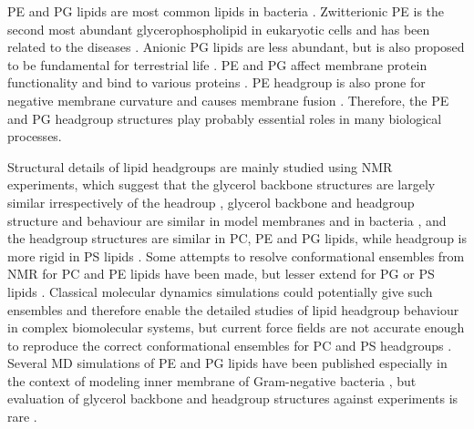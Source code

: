 \documentclass[aps,prl,superscriptaddress,twocolumn]{revtex4}
\begin{document}
PE and PG lipids are most common lipids in bacteria \cite{sohlenkamp16}.
Zwitterionic PE is the second most abundant glycerophospholipid in eukaryotic cells
and has been related to the diseases \cite{vance15,calzada16,patel17}.
Anionic PG lipids are less abundant, but is also proposed to be fundamental for terrestrial life \cite{furse17}.
PE and PG affect membrane protein functionality \cite{hariharan18} and bind to various proteins \cite{yeagle14}.
PE headgroup is also prone for negative membrane curvature and causes membrane fusion \cite{Chernomordik08,calzada16}.
Therefore, the PE and PG headgroup structures play probably essential roles in 
many biological processes.

Structural details of lipid headgroups are mainly studied using NMR experiments, which
suggest that the glycerol backbone structures are largely similar irrespectively of the headroup \cite{gally81}, 
glycerol backbone and headgroup structure and behaviour are similar in model membranes and in bacteria \cite{gally81,scherer87,seelig90},
and the headgroup structures are similar in PC, PE and PG lipids, while headgroup is more rigid in PS lipids \cite{wohlgemuth80,buldt81}. 
Some attempts to resolve conformational ensembles from NMR for PC and PE lipids have been made,
but lesser extend for PG or PS lipids \cite{seelig77c,davis83,Semchyschyn04}.
Classical molecular dynamics simulations could potentially give such ensembles and therefore enable
the detailed studies of lipid headgroup behaviour in complex biomolecular systems, but current
force fields are not accurate enough to reproduce the correct conformational ensembles for PC and PS headgroups \cite{botan15,antila19}.
Several MD simulations of PE and PG lipids have been published especially in the context of modeling
inner membrane of Gram-negative
bacteria \cite{devries04,murzyn05,pedersen06,zhao07,gurtovenko08,zhao08,henin09,kukol09,tsai12,dickson12,venable13,dickson14,berglund15}
,
but evaluation of glycerol backbone and headgroup structures against experiments is rare \cite{henin09}.
\end{document}
